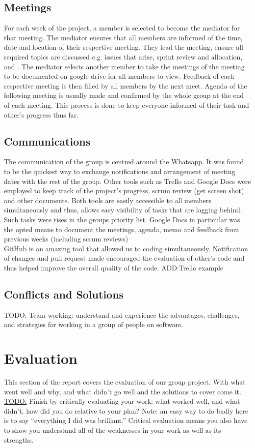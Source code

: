 \documentclass{article}[11pt,Tahoma]
\begin{document}
\begin{Abstract}
		\subsection{Meetings}
			For each week of the project, a member is selected to become the mediator for that meeting.  The mediator ensures that all members are informed of the time, date and location of their respective meeting.  They lead the meeting, ensure all required topics are discussed e.g. issues that arise, sprint review and allocation, and .  The mediator selects another member to take the meetings of the meeting to be documented on google drive for all members to view.  Feedback of each respective meeting is then filled by all members by the next meet.  Agenda of the following meeting is usually made and confirmed by the whole group at the end of each meeting.  This process is done to keep everyone informed of their task and other's progress thus far.
		\subsection{Communications}
			The communication of the group is centred around the Whatsapp. It was found to be the quickest way to exchange notifications and arrangement of meeting dates with the rest of the group. Other tools such as Trello and Google Docs were employed to keep track of the project's progress, scrum review (get screen shot) and other documents. Both tools are easily accessible to all members simultaneously and thus, allows easy visibility of tasks that are lagging behind. Such tasks were rises in the groups priority list. Google Docs in particular was the opted means to document the meetings, agenda, memo and feedback from previous weeks (including scrum reviews)\\
				GitHub is an amazing tool that allowed us to coding simultaneously. Notification of changes and pull request made encouraged the evaluation of other's code and thus helped improve the overall quality of the code.
				ADD:Trello example
		\subsection{Conflicts and Solutions}
		TODO: Team working: understand and experience the advantages, challenges, and strategies for working in a group of people on software.
	\section{Evaluation}
		This section of the report covers the evaluation of our group project.  With what went well and why, and what didn't go well and the solutions to cover come it.
		\underline{TODO:}
		Finish by critically evaluating your work: what worked well, and what didn’t; how did you do relative to your plan? Note: an easy way to do badly here is to say “everything I did was brilliant.” Critical evaluation means you also have to show you understand all of the weaknesses in your work as well as its strengths.

\end{Abstract}
\end{document}
